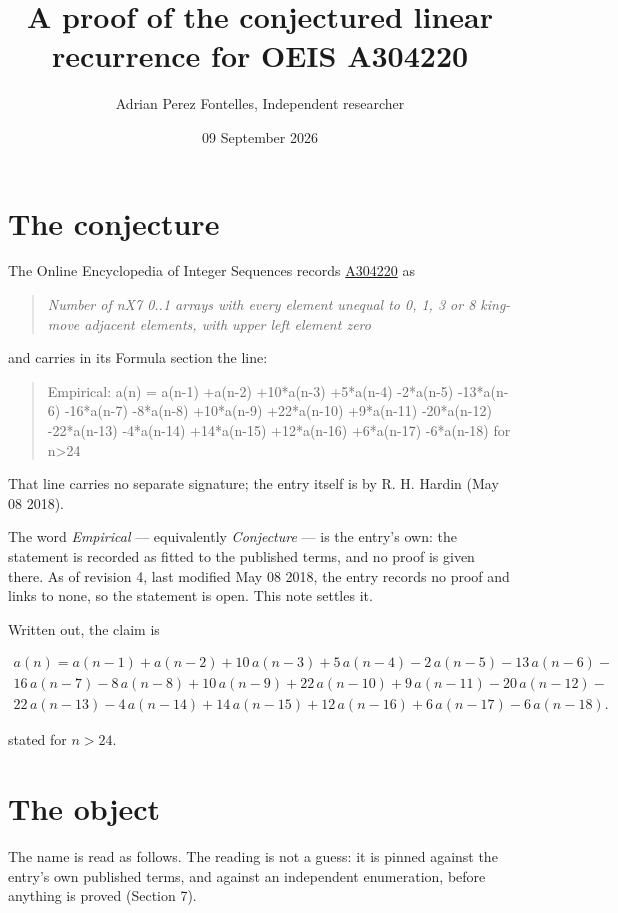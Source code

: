 \documentclass[11pt]{article}
\title{A proof of the conjectured linear recurrence for OEIS A304220}
\author{Adrian Perez Fontelles, Independent researcher}
\date{09 September 2026}
\theoremstyle{definition}
\begin{document}
\maketitle
\section{The conjecture}

The Online Encyclopedia of Integer Sequences records \href{https://oeis.org/A304220}{A304220} as

\begin{quote}\itshape Number of nX7 0..1 arrays with every element unequal to 0, 1, 3 or 8 king-move adjacent elements, with upper left element zero\end{quote}

and carries in its Formula section the line:

\begin{quote}\ttfamily Empirical: a(n) = a(n-1) +a(n-2) +10*a(n-3) +5*a(n-4) -2*a(n-5) -13*a(n-6) -16*a(n-7) -8*a(n-8) +10*a(n-9) +22*a(n-10) +9*a(n-11) -20*a(n-12) -22*a(n-13) -4*a(n-14) +14*a(n-15) +12*a(n-16) +6*a(n-17) -6*a(n-18) for n>24\end{quote}

That line carries no separate signature; the entry itself is by R. H. Hardin (May 08 2018).

The word {\itshape Empirical} --- equivalently {\itshape Conjecture} --- is the entry's own: the statement is recorded as fitted to the published terms, and no proof is given there. As of revision 4, last modified May 08 2018, the entry records no proof and links to none, so the statement is open. This note settles it.

Written out, the claim is

\begin{multline*} a(n) = a(n-1) + a(n-2) + 10\,a(n-3) + 5\,a(n-4) - 2\,a(n-5) - 13\,a(n-6) - \\ 16\,a(n-7) - 8\,a(n-8) + 10\,a(n-9) + 22\,a(n-10) + 9\,a(n-11) - 20\,a(n-12) - \\ 22\,a(n-13) - 4\,a(n-14) + 14\,a(n-15) + 12\,a(n-16) + 6\,a(n-17) - 6\,a(n-18). \end{multline*}

stated for $n > 24$.

\section{The object}

The name is read as follows. The reading is not a guess: it is pinned against the entry's own published terms, and against an independent enumeration, before anything is proved (Section 7).
\end{document}
